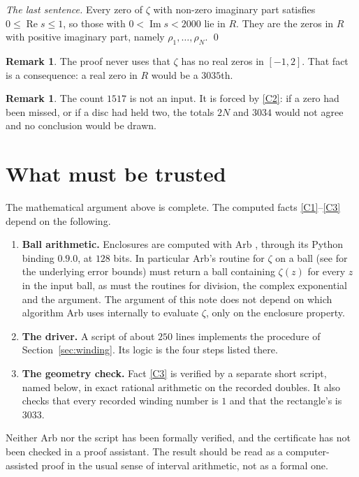 \documentclass[11pt,a4paper]{article}
\theoremstyle{definition}
\newtheorem{remark}[theorem]{Remark}
\DeclareMathOperator{\re}{Re}
\DeclareMathOperator{\im}{Im}
\begin{document}
\emph{The last sentence.} Every zero of $\zeta$ with non-zero imaginary part
satisfies $0\le\re s\le1$, so those with $0<\im s<2000$ lie in $R$. They are
the zeros in $R$ with positive imaginary part, namely $\rho_1,\dots,\rho_N$.
\qed

\begin{remark}
The proof never uses that $\zeta$ has no real zeros in $[-1,2]$. That fact is
a consequence: a real zero in $R$ would be a $3035$th.
\end{remark}

\begin{remark}
The count $1517$ is not an input. It is forced by \ref{C2}: if a zero had
been missed, or if a disc had held two, the totals $2N$ and $3034$ would not
agree and no conclusion would be drawn.
\end{remark}

\section{What must be trusted}\label{sec:trust}

The mathematical argument above is complete. The computed facts
\ref{C1}--\ref{C3} depend on the following.
\begin{enumerate}[leftmargin=2em]
\item \textbf{Ball arithmetic.} Enclosures are computed with Arb
  \cite{JohanssonArb}, through its Python binding 
  $0.9.0$, at $128$ bits. In particular Arb's routine for $\zeta$ on a ball
  (see \cite{JohanssonHurwitz} for the underlying error bounds) must return a
  ball containing $\zeta(z)$ for every $z$ in the input ball, as must the
  routines for division, the complex exponential and the argument. The
  argument of this note does not depend on which algorithm Arb uses
  internally to evaluate $\zeta$, only on the enclosure property.
\item \textbf{The driver.} A script of about $250$ lines implements the
  procedure of Section~\ref{sec:winding}. Its logic is the four steps listed
  there.
\item \textbf{The geometry check.} Fact \ref{C3} is verified by a separate
  short script, named below, in exact rational arithmetic on the recorded
  doubles. It also checks that every recorded
  winding number is $1$ and that the rectangle's is $3033$.
\end{enumerate}
Neither Arb nor the script has been formally verified, and the certificate has
not been checked in a proof assistant. The result should be read as a
computer-assisted proof in the usual sense of interval arithmetic, not as a
formal one.
\end{document}
